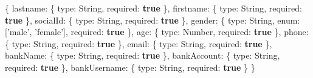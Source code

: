 \documentclass[
]{article}
\newenvironment{Shaded}{}{}
\newcommand{\DataTypeTok}[1]{\textcolor[rgb]{0.56,0.13,0.00}{#1}}
\newcommand{\KeywordTok}[1]{\textcolor[rgb]{0.00,0.44,0.13}{\textbf{#1}}}
\newcommand{\NormalTok}[1]{#1}
\newcommand{\OperatorTok}[1]{\textcolor[rgb]{0.40,0.40,0.40}{#1}}
\newcommand{\StringTok}[1]{\textcolor[rgb]{0.25,0.44,0.63}{#1}}
\begin{document}
\begin{Shaded}
\begin{Highlighting}[]
\OperatorTok{\{}
    \DataTypeTok{lastname}\OperatorTok{:} \OperatorTok{\{}
        \DataTypeTok{type}\OperatorTok{:}\NormalTok{ String}\OperatorTok{,}
        \DataTypeTok{required}\OperatorTok{:} \KeywordTok{true}
    \OperatorTok{\},}
    \DataTypeTok{firstname}\OperatorTok{:} \OperatorTok{\{}
        \DataTypeTok{type}\OperatorTok{:}\NormalTok{ String}\OperatorTok{,}
        \DataTypeTok{required}\OperatorTok{:} \KeywordTok{true}
    \OperatorTok{\},}
    \DataTypeTok{socialId}\OperatorTok{:} \OperatorTok{\{}
        \DataTypeTok{type}\OperatorTok{:}\NormalTok{ String}\OperatorTok{,}
        \DataTypeTok{required}\OperatorTok{:} \KeywordTok{true}
    \OperatorTok{\},}
    \DataTypeTok{gender}\OperatorTok{:} \OperatorTok{\{}
        \DataTypeTok{type}\OperatorTok{:}\NormalTok{ String}\OperatorTok{,}
        \DataTypeTok{enum}\OperatorTok{:}\NormalTok{ [}\StringTok{'male'}\OperatorTok{,} \StringTok{'female'}\NormalTok{]}\OperatorTok{,}
        \DataTypeTok{required}\OperatorTok{:} \KeywordTok{true}
    \OperatorTok{\},}
    \DataTypeTok{age}\OperatorTok{:} \OperatorTok{\{}
        \DataTypeTok{type}\OperatorTok{:}\NormalTok{ Number}\OperatorTok{,}
        \DataTypeTok{required}\OperatorTok{:} \KeywordTok{true}
    \OperatorTok{\},}
    \DataTypeTok{phone}\OperatorTok{:} \OperatorTok{\{}
        \DataTypeTok{type}\OperatorTok{:}\NormalTok{ String}\OperatorTok{,}
        \DataTypeTok{required}\OperatorTok{:} \KeywordTok{true}
    \OperatorTok{\},}
    \DataTypeTok{email}\OperatorTok{:} \OperatorTok{\{}
        \DataTypeTok{type}\OperatorTok{:}\NormalTok{ String}\OperatorTok{,}
        \DataTypeTok{required}\OperatorTok{:} \KeywordTok{true}
    \OperatorTok{\},}
    \DataTypeTok{bankName}\OperatorTok{:} \OperatorTok{\{}
        \DataTypeTok{type}\OperatorTok{:}\NormalTok{ String}\OperatorTok{,}
        \DataTypeTok{required}\OperatorTok{:} \KeywordTok{true}
    \OperatorTok{\},}
    \DataTypeTok{bankAccount}\OperatorTok{:} \OperatorTok{\{}
        \DataTypeTok{type}\OperatorTok{:}\NormalTok{ String}\OperatorTok{,}
        \DataTypeTok{required}\OperatorTok{:} \KeywordTok{true}
    \OperatorTok{\},}
    \DataTypeTok{bankUsername}\OperatorTok{:} \OperatorTok{\{}
        \DataTypeTok{type}\OperatorTok{:}\NormalTok{ String}\OperatorTok{,}
        \DataTypeTok{required}\OperatorTok{:} \KeywordTok{true}
    \OperatorTok{\}}
\OperatorTok{\}}
\end{Highlighting}
\end{Shaded}
\end{document}
